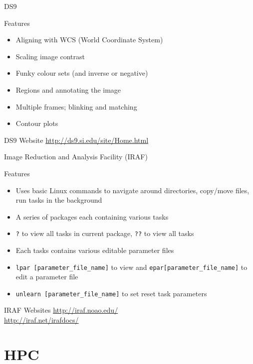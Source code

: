\documentclass{beamer}
\begin{document}
\begin{frame}{DS9}
  \begin{block}{Features}
   \begin{itemize}
    \item{Aligning with WCS (World Coordinate System)}
    \item{Scaling image contrast}
    \item{Funky colour sets (and inverse or negative)}
    \item{Regions and annotating the image}
    \item{Multiple frames; blinking and matching}    
    \item{Contour plots}
  \end{itemize}
  \end{block}
  \begin{block}{DS9 Website}
    \url{http://ds9.si.edu/site/Home.html}
  \end{block}
\end{frame}

\begin{frame}{Image Reduction and Analysis Facility (IRAF)}
  \begin{block}{Features}
   \begin{itemize}
    \item{Uses basic Linux commands to navigate around directories, copy/move files, run tasks in the background}
    \item{A series of packages each containing various tasks}
    \item{\texttt{?} to view all tasks in current package, \texttt{??} to view all tasks}
    \item{Each tasks contains various editable parameter files}
    \item{\texttt{lpar [parameter\_file\_name]} to view and \texttt{epar[parameter\_file\_name]} to edit a  parameter file}    
    \item{\texttt{unlearn [parameter\_file\_name]} to set reset task parameters}
   \end{itemize}
  \end{block}
  \begin{block}{IRAF Websites}
    \url{http://iraf.noao.edu/}\\
    \url{http://iraf.net/irafdocs/}
  \end{block}
\end{frame}

\section{HPC}
\end{document}
